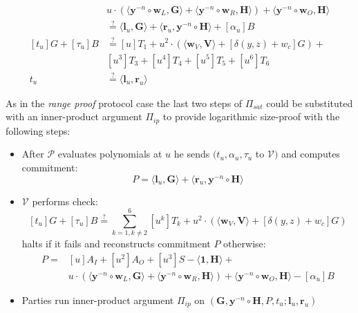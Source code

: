 \documentclass[../lecture-notes-148x210.tex]{subfiles}
\begin{document}
\begin{definition}
\begin{itemize}
\begin{equation*}
\begin{aligned}
                    &u \cdot (\langle \mathbf{y}^{-n} \circ \mathbf{w}_L, \mathbf{G} \rangle + \langle \mathbf{y}^{-n} \circ \mathbf{w}_R, \mathbf{H} \rangle) + \langle \mathbf{y}^{-n} \circ \mathbf{w}_O, \mathbf{H} \rangle \\
                    &\stackrel{\text{?}}{=} \langle \mathbf{l}_u, \mathbf{G} \rangle + \langle \mathbf{r}_u, \mathbf{y}^{-n} \circ \mathbf{H} \rangle + [\alpha_u]B\\
                    [t_u]G + [\tau_u]B &\stackrel{\text{?}}{=} [u]T_1 + u^2 \cdot (\langle \mathbf{w}_V, \mathbf{V} \rangle + [\delta(y,z) + w_c]G) +\\
                    &[u^3]T_3 + [u^4]T_4 + [u^5]T_5 + [u^6]T_6\\
                    t_u &\stackrel{\text{?}}{=} \langle \mathbf{l}_u, \mathbf{r}_u \rangle
                \end{aligned}
            \end{equation*}
    \end{itemize}
\end{definition}

\begin{remark}
    As in the \textit{range proof} protocol case the last two steps of $\Pi_{sat}$ could be substituted with an inner-product argument $\Pi_{ip}$ to provide logarithmic size-proof with the following steps:
    \begin{itemize}
        \item After $\mathcal{P}$ evaluates polynomials at $u$ he sends $(t_u, \alpha_u, \tau_u$ to $\mathcal{V})$ and computes commitment: 
        $$P = \langle \mathbf{l}_u, \mathbf{G} \rangle + \langle \mathbf{r}_u, \mathbf{y}^{-n} \circ \mathbf{H} \rangle$$
        \item $\mathcal{V}$ performs check: 
        $$
            [t_u]G + [\tau_u]B \stackrel{\text{?}}{=} \sum_{k=1, k\neq 2}^6 [u^k]T_k + u^2 \cdot (\langle \mathbf{w}_V, \mathbf{V} \rangle + [\delta(y,z) + w_c]G)
        $$
        halts if it fails and reconstructs commitment $P$ otherwise:
        \begin{align*}
            P =& [u]A_I + [u^2]A_O + [u^3]S - \langle \mathbf{1}, \mathbf{H} \rangle +\\
                &u \cdot (\langle \mathbf{y}^{-n} \circ \mathbf{w}_L, \mathbf{G} \rangle + \langle \mathbf{y}^{-n} \circ \mathbf{w}_R, \mathbf{H} \rangle) + \langle \mathbf{y}^{-n} \circ \mathbf{w}_O, \mathbf{H} \rangle - [\alpha_u]B
        \end{align*}
        \item Parties run inner-product argument $\Pi_{ip}$ on $(\mathbf{G},\mathbf{y}^{-n} \circ \mathbf{H}, P, t_u; \mathbf{l}_u, \mathbf{r}_u)$
    \end{itemize}
\end{remark}
\end{document}
